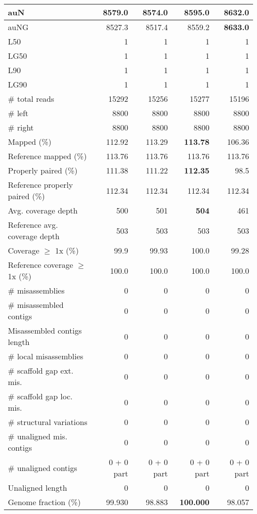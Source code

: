 \documentclass[12pt,a4paper]{article}
\begin{document}
\begin{table}[ht]
\begin{center}
\begin{tabular}{|l*{4}{|r}|}
auN & 8579.0 & 8574.0 & 8595.0 & {\bf 8632.0} \\ \hline
auNG & 8527.3 & 8517.4 & 8559.2 & {\bf 8633.0} \\ \hline
L50 & 1 & 1 & 1 & 1 \\ \hline
LG50 & 1 & 1 & 1 & 1 \\ \hline
L90 & 1 & 1 & 1 & 1 \\ \hline
LG90 & 1 & 1 & 1 & 1 \\ \hline
\# total reads & 15292 & 15256 & 15277 & 15196 \\ \hline
\# left & 8800 & 8800 & 8800 & 8800 \\ \hline
\# right & 8800 & 8800 & 8800 & 8800 \\ \hline
Mapped (\%) & 112.92 & 113.29 & {\bf 113.78} & 106.36 \\ \hline
Reference mapped (\%) & 113.76 & 113.76 & 113.76 & 113.76 \\ \hline
Properly paired (\%) & 111.38 & 111.22 & {\bf 112.35} & 98.5 \\ \hline
Reference properly paired (\%) & 112.34 & 112.34 & 112.34 & 112.34 \\ \hline
Avg. coverage depth & 500 & 501 & {\bf 504} & 461 \\ \hline
Reference avg. coverage depth & 503 & 503 & 503 & 503 \\ \hline
Coverage $\geq$ 1x (\%) & 99.9 & 99.93 & 100.0 & 99.28 \\ \hline
Reference coverage $\geq$ 1x (\%) & 100.0 & 100.0 & 100.0 & 100.0 \\ \hline
\# misassemblies & 0 & 0 & 0 & 0 \\ \hline
\# misassembled contigs & 0 & 0 & 0 & 0 \\ \hline
Misassembled contigs length & 0 & 0 & 0 & 0 \\ \hline
\# local misassemblies & 0 & 0 & 0 & 0 \\ \hline
\# scaffold gap ext. mis. & 0 & 0 & 0 & 0 \\ \hline
\# scaffold gap loc. mis. & 0 & 0 & 0 & 0 \\ \hline
\# structural variations & 0 & 0 & 0 & 0 \\ \hline
\# unaligned mis. contigs & 0 & 0 & 0 & 0 \\ \hline
\# unaligned contigs & 0 + 0 part & 0 + 0 part & 0 + 0 part & 0 + 0 part \\ \hline
Unaligned length & 0 & 0 & 0 & 0 \\ \hline
Genome fraction (\%) & 99.930 & 98.883 & {\bf 100.000} & 98.057 \\ \hline

\end{tabular}
\end{center}
\end{table}
\end{document}
